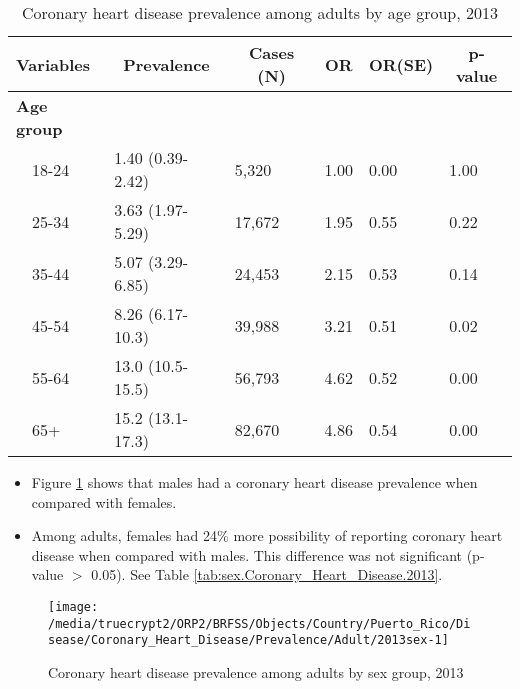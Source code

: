 \begin{table}[H]
\caption{Coronary heart disease prevalence  among adults by age group, 2013\label{tab:age.Coronary_Heart_Disease.2013}} 
\begin{center}
\begin{tabular}{llllll}
\hline\hline
\multicolumn{1}{l}{Variables}&\multicolumn{1}{c}{Prevalence}&\multicolumn{1}{c}{Cases (N)}&\multicolumn{1}{c}{OR}&\multicolumn{1}{c}{OR(SE)}&\multicolumn{1}{c}{p-value}\tabularnewline
\hline
{\bfseries Age group}&&&&&\tabularnewline
~~18-24&1.40 (0.39-2.42)& 5,320&1.00&0.00&1.00\tabularnewline
~~25-34&3.63 (1.97-5.29)&17,672&1.95&0.55&0.22\tabularnewline
~~35-44&5.07 (3.29-6.85)&24,453&2.15&0.53&0.14\tabularnewline
~~45-54&8.26 (6.17-10.3)&39,988&3.21&0.51&0.02\tabularnewline
~~55-64&13.0 (10.5-15.5)&56,793&4.62&0.52&0.00\tabularnewline
~~65+&15.2 (13.1-17.3)&82,670&4.86&0.54&0.00\tabularnewline
\hline
\end{tabular}\end{center}

\end{table}


\newpage
\begin{itemize}

\item Figure \ref{fig:sex.Coronary_Heart_Disease.2013} shows that males had a 
coronary heart disease prevalence when compared with females.


\item Among adults, females had 24\% more possibility of reporting coronary heart disease when compared with males. This difference was not significant (p-value $>$ 0.05). See Table \ref{tab:sex.Coronary_Heart_Disease.2013}.

\end{itemize}

\begin{figure}[H]
\caption{Coronary heart disease prevalence among adults by sex group, 
2013}
\begin{knitrout}
\color{fgcolor}

{\centering \texttt{[image: /media/truecrypt2/ORP2/BRFSS/Objects/Country/Puerto\_Rico/Disease/Coronary\_Heart\_Disease/Prevalence/Adult/2013sex-1]} 

}



\end{knitrout}
\label{fig:sex.Coronary_Heart_Disease.2013}
\end{figure}

